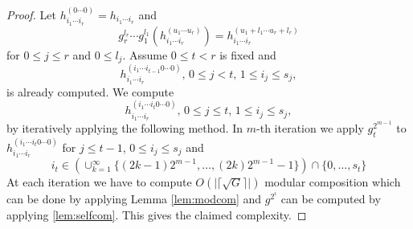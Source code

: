 \begin{proof}
Let $h_{i_1 \cdots i_r}^{(0 \cdots 0)} = h_{i_1 \cdots i_r}$ and $$g_r^{l_r} \cdots g_1^{l_1}(h_{i_1 \cdots i_r}^{(u_1 \cdots u_r)}) = h_{i_1 \cdots i_r}^{(u_1+l_1 \cdots u_r+l_r)}$$ for $0 \leq j \leq r$ and $0 \leq l_j$.
Assume $0 \leq t < r$ is fixed and $$h_{i_1 \cdots i_r}^{(i_1 \cdots i_{t-1}0 \cdots 0)}, \, 0 \leq j < t, \, 
1 \leq i_j \leq s_j,$$ is already computed. We compute 
$$h_{i_1 \cdots i_r}^{(i_1 \cdots i_{t}0 \cdots 0)}, \, 0 \leq j \leq t, \, 1 \leq i_j \leq s_j,$$
by iteratively applying the following method. In $m$-th iteration we apply $g_t^{2^{m-1}}$ to $h_{i_1 \cdots i_r}^{(i_1 \cdots i_{t}0 \cdots 0)}$ for $j \leq t-1$, $0 \leq i_j \leq s_j$ and 
$$i_t \in \left(\cup_{k = 1}^{\infty} \lbrace (2k-1)2^{m-1}, \ldots , (2k)2^{m-1}-1 \rbrace\right) \cap \lbrace 0 , \ldots , s_t \rbrace $$
At each iteration we have to compute $O(\vert \lceil \sqrt{G} \rceil \vert)$ modular composition which can be done by applying
Lemma \ref{lem:modcom} and $g^{2^i}$ can be computed by applying \ref{lem:selfcom}. This gives the claimed complexity.
\end{proof}

